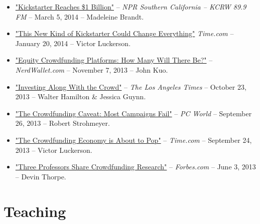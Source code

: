 \documentclass[10.5pt,letterpaper,sans]{moderncv}        %
\begin{document}
\begin{itemize}
\item \textcolor{gray}{\href{http://www.kcrw.com/etc/programs/pp/pp140305vaping_chevron_in_ec}{"Kickstarter Reaches \$1 Billion"}} -- \textit{NPR Southern California -- KCRW 89.9 FM} -- March 5, 2014 -- Madeleine Brandt.

\item \textcolor{gray}{\href{http://business.time.com/2014/01/20/ibm-internal-enterprise-crowdfunding-mimics-kickstarter/}{"This New Kind of Kickstarter Could Change Everything"}} \textit{Time.com} -- January 20, 2014 -- Victor Luckerson.

\item \textcolor{gray}{\href{http://www.nerdwallet.com/blog/investing/2013/equity-crowdfunding-platforms/}{"Equity Crowdfunding Platforms: How Many Will There Be?"}} -- \textit{NerdWallet.com} -- November 7, 2013 -- John Kuo.

\item \textcolor{gray}{\href{http://articles.latimes.com/2013/oct/23/business/la-fi-crowdfunding-20131024}{"Investing Along With the Crowd"}} -- \textit{The Los Angeles Times} -- October 23, 2013 -- Walter Hamilton \& Jessica Guynn.

\item \textcolor{gray}{\href{http://www.pcworld.com/article/2049399/the-crowdfunding-caveat-most-campaigns-fail.html}{"The Crowdfunding Caveat: Most Campaigns Fail"}} -- \textit{PC World} -- September 26, 2013 -- Robert Strohmeyer.

\item \textcolor{gray}{\href{http://business.time.com/2013/09/24/the-crowdfunding-economy-is-about-to-pop/}{"The Crowdfunding Economy is About to Pop"}} -- \textit{Time.com} -- September 24, 2013 -- Victor Luckerson.

\item \textcolor{gray}{\href{http://www.forbes.com/sites/devinthorpe/2013/06/03/three-professors-share-crowdfunding-research-tune-in-to-learn-how-to-make-your-campaign-a-success/}{"Three Professors Share Crowdfunding Research"}} -- \textit{Forbes.com} -- June 3, 2013 -- Devin Thorpe.

\end{itemize}

\section{Teaching}
\end{document}
